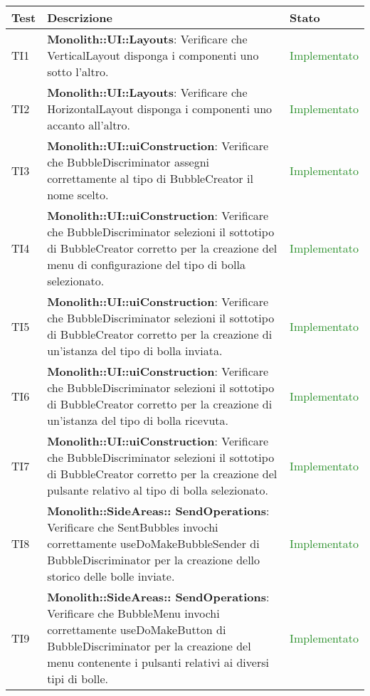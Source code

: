 \begin{center}
\begin{longtable}{|
*{1}{>{\centering\arraybackslash}p{1cm}|}
*{1}{>{\centering\arraybackslash}p{7cm}|}
*{1}{>{\centering\arraybackslash}p{3cm}|}}
\hline \textbf{Test} & \textbf{Descrizione} & \textbf{Stato}\\
\hline \endhead

TI1 & \textbf{Monolith::UI::Layouts}: Verificare che VerticalLayout disponga i componenti uno sotto l'altro. & \textcolor{ForestGreen}{Implementato}\\
 \hline 
TI2 & \textbf{Monolith::UI::Layouts}: Verificare che HorizontalLayout disponga i componenti uno accanto all'altro. & \textcolor{ForestGreen}{Implementato}\\
 \hline 
TI3 & \textbf{Monolith::UI::uiConstruction}: Verificare che BubbleDiscriminator assegni correttamente al tipo di BubbleCreator il nome scelto. & \textcolor{ForestGreen}{Implementato}\\
 \hline 
TI4 & \textbf{Monolith::UI::uiConstruction}: Verificare che BubbleDiscriminator selezioni il sottotipo di BubbleCreator corretto per la creazione del menu di configurazione del tipo di bolla selezionato. & \textcolor{ForestGreen}{Implementato}\\
 \hline 
TI5 & \textbf{Monolith::UI::uiConstruction}: Verificare che BubbleDiscriminator selezioni il sottotipo di BubbleCreator corretto per la creazione di un'istanza del tipo di bolla inviata. & \textcolor{ForestGreen}{Implementato}\\
 \hline 
TI6 & \textbf{Monolith::UI::uiConstruction}: Verificare che BubbleDiscriminator selezioni il sottotipo di BubbleCreator corretto per la creazione di un'istanza del tipo di bolla ricevuta. & \textcolor{ForestGreen}{Implementato}\\
 \hline 
TI7 & \textbf{Monolith::UI::uiConstruction}: Verificare che BubbleDiscriminator selezioni il sottotipo di BubbleCreator corretto per la creazione del pulsante relativo al tipo di bolla selezionato. & \textcolor{ForestGreen}{Implementato}\\
 \hline 
TI8 & \textbf{Monolith::SideAreas:: SendOperations}: Verificare che SentBubbles invochi correttamente useDoMakeBubbleSender di BubbleDiscriminator per la creazione dello storico delle bolle inviate. & \textcolor{ForestGreen}{Implementato}\\
 \hline 
TI9 & \textbf{Monolith::SideAreas:: SendOperations}: Verificare che BubbleMenu invochi correttamente useDoMakeButton di BubbleDiscriminator per la creazione del menu contenente i pulsanti relativi ai diversi tipi di bolle. & \textcolor{ForestGreen}{Implementato}\\

\end{longtable}
\end{center}
